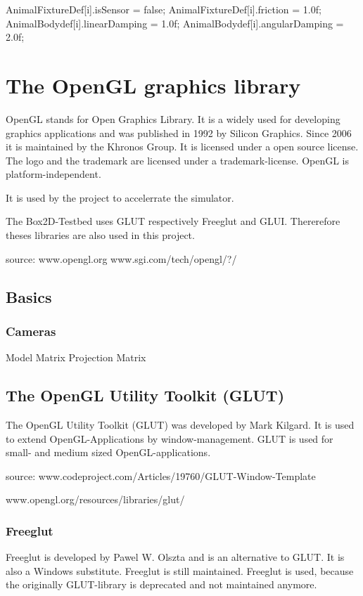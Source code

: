 \documentclass[10pt,a4paper,DIV=11]{scrreprt}
\begin{document}
AnimalFixtureDef[i].isSensor = false;
AnimalFixtureDef[i].friction = 1.0f;
AnimalBodydef[i].linearDamping = 1.0f;
AnimalBodydef[i].angularDamping = 2.0f;

\chapter{The OpenGL graphics library}
OpenGL stands for Open Graphics Library. It is a widely used for developing graphics applications and was published in 1992 by Silicon Graphics. Since 2006 it is maintained by the Khronos Group. It is licensed under a open source license. The logo and the trademark are licensed under a trademark-license.
OpenGL is platform-independent.


It is used by the project to accelerrate the simulator.

The Box2D-Testbed uses GLUT respectively Freeglut and GLUI. Thererefore theses libraries are also used in this project.

source: www.opengl.org
www.sgi.com/tech/opengl/?/

\section{Basics}

\subsection{Cameras}

Model Matrix
Projection Matrix

\section{The OpenGL Utility Toolkit (GLUT)}
The OpenGL Utility Toolkit (GLUT) was developed by Mark Kilgard. It is used to extend OpenGL-Applications by window-management. GLUT is used for small- and medium sized OpenGL-applications.

source: www.codeproject.com/Articles/19760/GLUT-Window-Template

www.opengl.org/resources/libraries/glut/

\subsection{Freeglut}
Freeglut is developed by Pawel W. Olszta and is an alternative to GLUT. It is also a Windows substitute. Freeglut is still maintained. Freeglut is used, because the originally GLUT-library is deprecated and not maintained anymore.
\end{document}
